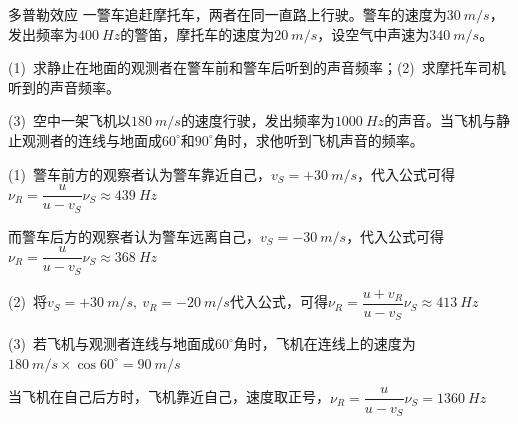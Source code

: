 \begin{example}{多普勒效应}
    一警车追赶摩托车，两者在同一直路上行驶。警车的速度为$\SI{30}{m/s}$，发出频率为$\SI{400}{Hz}$的警笛，摩托车的速度为$\SI{20}{m/s}$，设空气中声速为$\SI{340}{m/s}$。
    
    
    (1)~求静止在地面的观测者在警车前和警车后听到的声音频率；(2)~求摩托车司机听到的声音频率。
    
    
    (3)~空中一架飞机以$\SI{180}{m/s}$的速度行驶，发出频率为$\SI{1000}{Hz}$的声音。当飞机与静止观测者的连线与地面成$60^\circ$和$90^\circ$角时，求他听到飞机声音的频率。

    \tcblower

    (1)~警车前方的观察者认为警车靠近自己，$v_S=+\SI{30}{m/s}$，代入公式可得$\nu_R=\dfrac{u}{u-v_S}\nu_S\approx \SI{439}{Hz}$

    \vspace{0.3em}

    而警车后方的观察者认为警车远离自己，$v_S=-\SI{30}{m/s}$，代入公式可得$\nu_R=\dfrac{u}{u-v_S}\nu_S\approx \SI{368}{Hz}$

    \vspace{0.3em}

    (2)~将$v_S=+\SI{30}{m/s},~v_R=-\SI{20}{m/s}$代入公式，可得$\nu_R=\dfrac{u+v_R}{u-v_S}\nu_S\approx\SI{413}{Hz}$

    \vspace{0.3em}





    (3)~若飞机与观测者连线与地面成$60^\circ$角时，飞机在连线上的速度为$\SI{180}{m/s}\times \cos{60^\circ}=\SI{90}{m/s}$

    \vspace{0.3em}

    当飞机在自己后方时，飞机靠近自己，速度取正号，$\nu_R=\dfrac{u}{u-v_S}\nu_S= \SI{1360}{Hz}$


\end{example}
